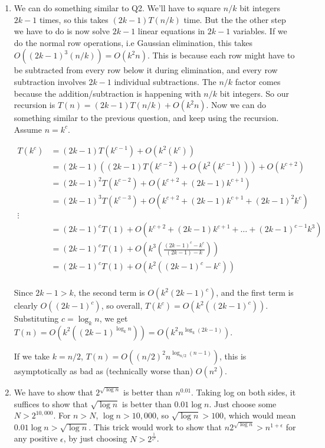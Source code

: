 \documentclass[12pt]{report}
\begin{document}
\begin{enumerate}[label=\textbf{\arabic*.}]
    \item We can do something similar to Q2. We'll have to square $n/k$ bit integers $2k-1$ times, so this takes $(2k - 1)T(n/k)$ time. But the 
    the other step we have to do is now solve $2k-1$ linear equations in $2k-1$ variables. If we do the normal row operations, i.e Gaussian
    elimination, this takes $O({(2k-1)}^3 (n/k)) = O(k^2 n)$. This is because each row might have to be subtracted from every row below it 
    during elimination, and every row subtraction involves $2k-1$ individual subtractions. 
    The $n/k$ factor comes because the addition/subtraction is happening with $n/k$ bit integers.
    So our recursion is 
    $T(n) = (2k-1)T(n/k) + O(k^2 n)$. Now we can do something similar to the previous question, and keep using the recursion. Assume $n = k^c$.

    \begin{align*}
        T(k^c) &= (2k-1)T(k^{c-1}) + O(k^2 (k^c)) \\
        &= (2k-1)((2k-1)T(k^{c-2}) + O(k^2 (k^{c-1}))) + O(k^{c+2}) \\
        &= {(2k-1)}^2 T(k^{c-2}) + O(k^{c+2} + (2k-1) k^{c+1}) \\
        &= {(2k-1)}^3 T(k^{c-3}) + O(k^{c+2} + (2k-1) k^{c+1} + {(2k-1)}^2 k^c) \\
        \vdots \\
        &= {(2k-1)}^c T(1) + O(k^{c+2} + (2k-1) k^{c+1} + \dots + {(2k-1)}^{c-1} k^3) \\
        &= {(2k-1)}^c T(1) + O\left(k^3 \left(\frac{{(2k-1)}^c - k^c}{(2k-1) - k}\right)\right) \\
        &= {(2k-1)}^c T(1) + O(k^2({(2k-1)}^c - k^c)) \\
    \end{align*}

    Since $2k-1 > k$, the second term is $O(k^2{(2k-1)}^c)$, and the first term is clearly $O({(2k-1)}^c)$, so overall, $T(k^c) = O(k^2 ({(2k-1)}^c))$.
    Substituting $c = \log_k n$, we get $T(n) = O(k^2 ({(2k-1)}^{\log_k n})) = O(k^2 n^{\log_k (2k-1)})$.

    If we take $k = n/2$, $T(n) = O({(n/2)}^2 n^{\log_{n/2} (n-1)})$, this is asymptotically as bad as (technically worse than) $O(n^2)$.

    \item We have to show that $2^{\sqrt{\log n}}$ is better than $n^{0.01}$. Taking log on both sides, it suffices to show that $\sqrt{\log n}$ is better
    than $0.01 \log n$. Just choose some $N > 2^{10,000}$. For $n > N$, $\log n > 10,000$, so $\sqrt{\log n} > 100$, which would mean $0.01 \log n >  
    \sqrt{\log n}$. This trick would work to show that $n 2^{\sqrt{\log n}} > n^{1 + \epsilon}$ for any positive $\epsilon$, by just choosing
    $N > 2^{\frac{1}{\epsilon^2}}$. 


\end{enumerate}
\end{document}

